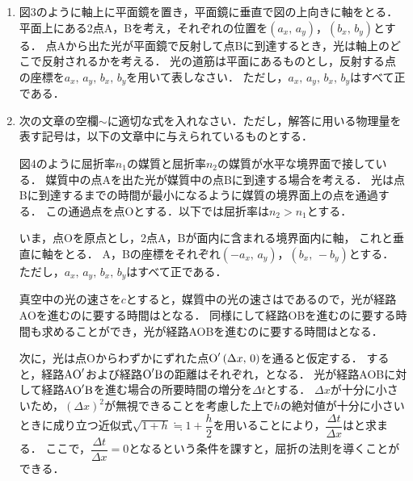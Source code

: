 \begin{enumerate}[（1）]
  \setlength{\leftskip}{-1zw}
  \setlength{\itemindent}{1zw}\setlength{\labelsep}{0.5zw}
  \setlength{\labelwidth}{1zw}\setlength{\leftmargin}{1zw}
  \setlength{\itemsep}{0.5\baselineskip}
  \addtocounter{enumi}{4}
  \item 図3のように\x 軸上に平面鏡を置き，平面鏡に垂直で図の上向きに\y 軸をとる．
  \xy 平面上にある2点A，Bを考え，それぞれの位置を\mbox{$(a_x,\,a_y)$}，\mbox{$(b_x,\,b_y)$}とする．
  点Aから出た光が平面鏡で反射して点Bに到達するとき，光は\x 軸上のどこで反射されるかを考える．
  光の道筋は\xy 平面にあるものとし，反射する点の\x 座標を$a_x,\,a_y,\,b_x,\,b_y$を用いて表しなさい．
  ただし，$a_x,\,a_y,\,b_x,\,b_y$はすべて正である．
  \item 次の文章の空欄$\sim$に適切な式を入れなさい．ただし，解答に用いる物理量を表す記号は，以下の文章中に与えられているものとする．\par 
  \vspace{.5\baselineskip}\quad 
  図4のように屈折率$n_1$の媒質と屈折率$n_2$の媒質が水平な境界面で接している．
  媒質中の点Aを出た光が媒質中の点Bに到達する場合を考える．
  光は点Bに到達するまでの時間が最小になるように媒質の境界面上の点を通過する．
  この通過点を点Oとする．以下では屈折率は$n_2>n_1$とする．\par \quad 
  いま，点Oを原点とし，2点A，Bが\xy 面内に含まれる境界面内に\x 軸，
  これと垂直に\y 軸をとる．
  A，Bの座標をそれぞれ$(-a_x,\,a_y)$，$(b_x,\,-b_y)$とする．
  ただし，$a_x,\,a_y,\,b_x,\,b_y$はすべて正である．\par\quad 
  真空中の光の速さを$c$とすると，媒質中の光の速さはであるので，光が経路AOを進むのに要する時間はとなる．
  同様にして経路OBを進むのに要する時間も求めることができ，光が経路AOBを進むのに要する時間はとなる．\par\quad 
  次に，光は点Oからわずかにずれた点$\textup{O}^\prime\,(\Delta x,\,0)$を通ると仮定する．
  すると，経路$\textup{A}\textup{O}^\prime$および経路$\textup{O}^\prime\textup{B}$の距離はそれぞれ，となる．
  光が経路AOBに対して経路$\textup{A}\textup{O}^\prime\textup{B}$を進む場合の所要時間の増分を$\Delta t$とする．
  $\Delta x$が十分に小さいため，$(\Delta x)^2$が無視できることを考慮した上で$h$の絶対値が十分に小さいときに成り立つ近似式$\sqrt{1+h}\fallingdotseq 1+\dfrac{h}{2}$を用いることにより，$\dfrac{\Delta t}{\Delta x}$はと求まる．
  ここで，$\dfrac{\Delta t}{\Delta x}=0$となるという条件を課すと，屈折の法則を導くことができる．
\end{enumerate}

